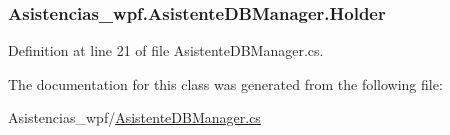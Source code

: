 \hypertarget{class_asistencias__wpf_1_1_asistente_d_b_manager_a4f73db2d92f913ccc8862126717968cd}{
\subsubsection[{Holder}]{ Asistencias\-\_\-wpf.\-Asistente\-D\-B\-Manager.\-Holder\hspace{0.3cm}{\ttfamily [private]}}}\label{class_asistencias__wpf_1_1_asistente_d_b_manager_a4f73db2d92f913ccc8862126717968cd}


Definition at line 21 of file Asistente\-D\-B\-Manager.\-cs.



The documentation for this class was generated from the following file\-:\begin{DoxyCompactItemize}
\item 
Asistencias\-\_\-wpf/\hyperlink{_asistente_d_b_manager_8cs}{Asistente\-D\-B\-Manager.\-cs}\end{DoxyCompactItemize}
